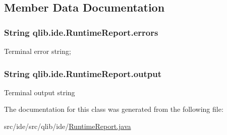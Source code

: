 \subsection{Member Data Documentation}
\subsubsection[{\texorpdfstring{errors}{errors}}]{\setlength{\rightskip}{0pt plus 5cm}String qlib.\+ide.\+Runtime\+Report.\+errors}\hypertarget{classqlib_1_1ide_1_1RuntimeReport_a7fd9bcb04c31f5b5a9d57acc1bbcb443}{}\label{classqlib_1_1ide_1_1RuntimeReport_a7fd9bcb04c31f5b5a9d57acc1bbcb443}
Terminal error string; 
\subsubsection[{\texorpdfstring{output}{output}}]{\setlength{\rightskip}{0pt plus 5cm}String qlib.\+ide.\+Runtime\+Report.\+output}\hypertarget{classqlib_1_1ide_1_1RuntimeReport_a92b04311367af6afee4add7142aebc99}{}\label{classqlib_1_1ide_1_1RuntimeReport_a92b04311367af6afee4add7142aebc99}
Terminal output string 

The documentation for this class was generated from the following file\+:\begin{DoxyCompactItemize}
\item 
src/ide/src/qlib/ide/\hyperlink{RuntimeReport_8java}{Runtime\+Report.\+java}\end{DoxyCompactItemize}
